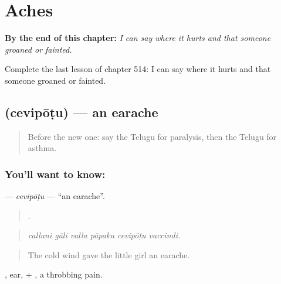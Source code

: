 
\chapter{Aches}
\label{ch:te-aches}

\begin{chapteropening}
\textbf{By the end of this chapter:} \emph{I can say where it hurts and that someone groaned or fainted.}

Complete the last lesson of chapter 514: I can say where it hurts and that someone groaned or fainted.
\end{chapteropening}

\section[\texorpdfstring{\te{చెవిపోటు} (cevipōṭu)}{చెవిపోటు (cevipōṭu)}]{ (cevipōṭu) — an earache}

\label{lesson:TE-C514-cevipotu}



\begin{quote}
Before the new one: say the Telugu for paralysis, then the Telugu for asthma.
\end{quote}

\subsection*{You'll want to know: }
\textbf{} — \emph{cevipōṭu} — \textquotedblleft{}an earache\textquotedblright{}.

\begin{quote}
     .
\end{quote}

\begin{quote}
\emph{callani gāli valla pāpaku cevipōṭu vaccindi.}
\end{quote}

\begin{quote}
The cold wind gave the little girl an earache.
\end{quote}

, ear, + , a throbbing pain.

